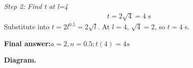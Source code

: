 \documentclass[11pt]{article}
\begin{document}
\textit{Step 2: Find t at l=4}
\[\begin{gathered}
t = 2\sqrt{4} = 4 \text{ s}
\end{gathered}\]
Substitute into \( t = 2l^{0.5} = 2\sqrt{l} \). At \( l = 4 \), \( \sqrt{4} = 2 \), so \( t = 4 \) s.

\begin{answerbox}
\textbf{Final answer:}\quad \(\displaystyle a = 2, n = 0.5; t(4) = 4 s\)
\end{answerbox}
\textbf{Diagram.}

\begin{center}
\end{center}
\end{document}
